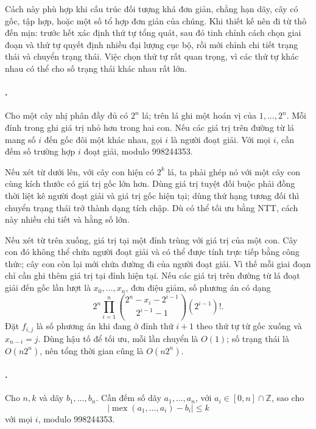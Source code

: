 \documentclass[11pt]{article}
\begin{document}
Cách này phù hợp khi cấu trúc đối tượng khá đơn giản, chẳng hạn dãy, cây có
gốc, tập hợp, hoặc một số tổ hợp đơn giản của chúng. Khi thiết kế nên đi từ thô
đến mịn: trước hết xác định thứ tự tổng quát, sau đó tinh chỉnh cách chọn giai
đoạn và thứ tự quyết định nhiều đại lượng cục bộ, rồi mới chỉnh chi tiết trạng
thái và chuyển trạng thái. Việc chọn thứ tự rất quan trọng, vì các thứ tự khác
nhau có thể cho số trạng thái khác nhau rất lớn.

\paragraph{.}
Cho một cây nhị phân đầy đủ có \(2^n\) lá; trên lá ghi một hoán vị của
\(1,\ldots,2^n\). Mỗi đỉnh trong ghi giá trị nhỏ hơn trong hai con. Nếu các giá
trị trên đường từ lá mang số \(i\) đến gốc đôi một khác nhau, gọi \(i\) là
người đoạt giải. Với mọi \(i\), cần đếm số trường hợp \(i\) đoạt giải, modulo
998244353.

Nếu xét từ dưới lên, với cây con hiện có \(2^k\) lá, ta phải ghép nó với một cây
con cùng kích thước có giá trị gốc lớn hơn. Dùng giá trị tuyệt đối buộc phải
đồng thời liệt kê người đoạt giải và giá trị gốc hiện tại; dùng thứ hạng tương
đối thì chuyển trạng thái trở thành dạng tích chập. Dù có thể tối ưu bằng NTT,
cách này nhiều chi tiết và hằng số lớn.

Nếu xét từ trên xuống, giá trị tại một đỉnh trùng với giá trị của một con. Cây
con đó không thể chứa người đoạt giải và có thể được tính trực tiếp bằng công
thức; cây con còn lại mới chứa đường đi của người đoạt giải. Vì thế mỗi giai
đoạn chỉ cần ghi thêm giá trị tại đỉnh hiện tại. Nếu các giá trị trên đường từ
lá đoạt giải đến gốc lần lượt là \(x_0,\ldots,x_n\), đơn điệu giảm, số phương
án có dạng
\[
  2^n\prod_{i=1}^{n}
  \binom{2^n-x_i-2^{i-1}}{2^{i-1}-1}(2^{i-1})!.
\]
Đặt \(f_{i,j}\) là số phương án khi đang ở đỉnh thứ \(i+1\) theo thứ tự từ gốc
xuống và \(x_{n-i}=j\). Dùng hậu tố để tối ưu, mỗi lần chuyển là \(O(1)\); số
trạng thái là \(O(n2^n)\), nên tổng thời gian cũng là \(O(n2^n)\).

\paragraph{.}
Cho \(n,k\) và dãy \(b_1,\ldots,b_n\). Cần đếm số dãy
\(a_1,\ldots,a_n\), với \(a_i\in[0,n]\cap\mathbb Z\), sao cho
\[
  \left|\operatorname{mex}(a_1,\ldots,a_i)-b_i\right|\le k
\]
với mọi \(i\), modulo 998244353.
\end{document}
